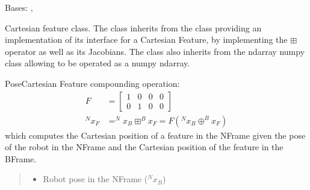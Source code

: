 \documentclass[letterpaper,10pt,english]{sphinxmanual}
\begin{document}
\begin{fulllineitems}
\label{\detokenize{Feature:Feature.CartesianFeature}}
\pysigstartsignatures
{}
\pysigstopsignatures
\sphinxAtStartPar
Bases: {\hyperref[\detokenize{Feature:Feature.Feature}]{}}, 

\sphinxAtStartPar
Cartesian feature class. The class inherits from the {\hyperref[\detokenize{Feature:Feature.Feature}]{}} class providing an implementation of its
interface for a Cartesian Feature, by implementing the \(\boxplus\) operator as well as its Jacobians. The
class also inherits from the ndarray numpy class allowing to be operated as a numpy ndarray.

\begin{fulllineitems}
\label{\detokenize{Feature:Feature.CartesianFeature.boxplus}}
\pysigstartsignatures
{}
\pysigstopsignatures
\sphinxAtStartPar
Pose\sphinxhyphen{}Cartesian Feature compounding operation:
\begin{equation}\label{equation:Feature:eq-boxplus2DCartesian}
\begin{split}F&=\begin{bmatrix} 1 & 0 & 0 & 0 \\ 0 & 1 & 0 & 0 \end{bmatrix}\\
^Nx_F&=^Nx_B \boxplus ^Bx_F = F ( ^Nx_B \oplus ^Bx_F )\end{split}
\end{equation}
\sphinxAtStartPar
which computes the Cartesian position of a feature in the N\sphinxhyphen{}Frame given the pose of the robot in the N\sphinxhyphen{}Frame and
the Cartesian position of the feature in the B\sphinxhyphen{}Frame.
\begin{quote}\begin{description}
\begin{itemize}
\item {} 
\sphinxAtStartPar
{} \textendash{} Robot pose in the N\sphinxhyphen{}Frame (\(^Nx_B\))


\end{itemize}
\end{description}
\end{quote}
\end{fulllineitems}
\end{fulllineitems}
\end{document}
